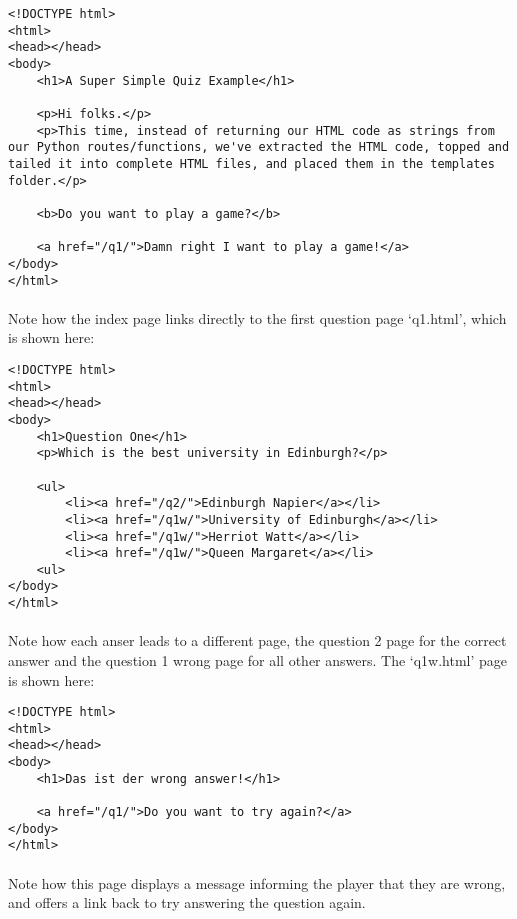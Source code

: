 \begin{lstlisting}
<!DOCTYPE html>
<html>
<head></head>
<body>
    <h1>A Super Simple Quiz Example</h1>

    <p>Hi folks.</p>
    <p>This time, instead of returning our HTML code as strings from our Python routes/functions, we've extracted the HTML code, topped and tailed it into complete HTML files, and placed them in the templates folder.</p>

    <b>Do you want to play a game?</b>

    <a href="/q1/">Damn right I want to play a game!</a>
</body>
</html>
\end{lstlisting}

\paragraph{} Note how the index page links directly to the first question page `q1.html', which is shown here:

\begin{lstlisting}
<!DOCTYPE html>
<html>
<head></head>
<body>
    <h1>Question One</h1>
    <p>Which is the best university in Edinburgh?</p>

    <ul>
        <li><a href="/q2/">Edinburgh Napier</a></li>
        <li><a href="/q1w/">University of Edinburgh</a></li>
        <li><a href="/q1w/">Herriot Watt</a></li>
        <li><a href="/q1w/">Queen Margaret</a></li>
    <ul>
</body>
</html>
\end{lstlisting}

\paragraph{} Note how each anser leads to a different page, the question 2 page for the correct answer and the question 1 wrong page for all other answers. The `q1w.html' page is shown here:


\begin{lstlisting}
<!DOCTYPE html>
<html>
<head></head>
<body>
    <h1>Das ist der wrong answer!</h1>

    <a href="/q1/">Do you want to try again?</a>
</body>
</html>
\end{lstlisting}

\paragraph{} Note how this page displays a message informing the player that they are wrong, and offers a link back to try answering the question again.

